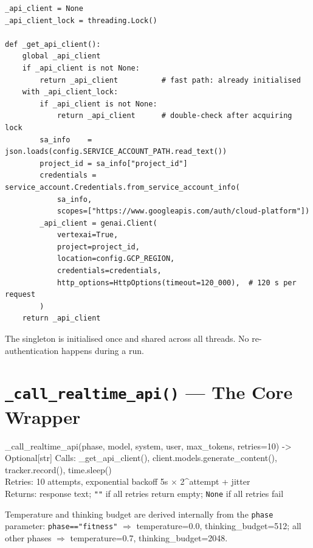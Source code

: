 \documentclass[11pt,a4paper]{report}
\newcommand{\fn}[1]{\texttt{#1}}
\begin{document}
\begin{lstlisting}[style=py]
_api_client = None
_api_client_lock = threading.Lock()

def _get_api_client():
    global _api_client
    if _api_client is not None:
        return _api_client          # fast path: already initialised
    with _api_client_lock:
        if _api_client is not None:
            return _api_client      # double-check after acquiring lock
        sa_info    = json.loads(config.SERVICE_ACCOUNT_PATH.read_text())
        project_id = sa_info["project_id"]
        credentials = service_account.Credentials.from_service_account_info(
            sa_info,
            scopes=["https://www.googleapis.com/auth/cloud-platform"])
        _api_client = genai.Client(
            vertexai=True,
            project=project_id,
            location=config.GCP_REGION,
            credentials=credentials,
            http_options=HttpOptions(timeout=120_000),  # 120 s per request
        )
    return _api_client
\end{lstlisting}

The singleton is initialised once and shared across all threads.  No re-authentication
happens during a run.

\section{\fn{\_call\_realtime\_api()} --- The Core Wrapper}

\begin{spec}{\_call\_realtime\_api(phase, model, system, user, max\_tokens, retries=10) -> Optional[str]}
Calls: \_get\_api\_client(), client.models.generate\_content(), tracker.record(), time.sleep()\\
Retries: 10 attempts, exponential backoff 5s $\times$ 2\textasciicircum{attempt} + jitter\\
Returns: response text; \fn{""} if all retries return empty; \fn{None} if all retries fail
\end{spec}

Temperature and thinking budget are derived internally from the \fn{phase} parameter:
\fn{phase=="fitness"} $\Rightarrow$ temperature=0.0, thinking\_budget=512;
all other phases $\Rightarrow$ temperature=0.7, thinking\_budget=2048.
\end{document}
